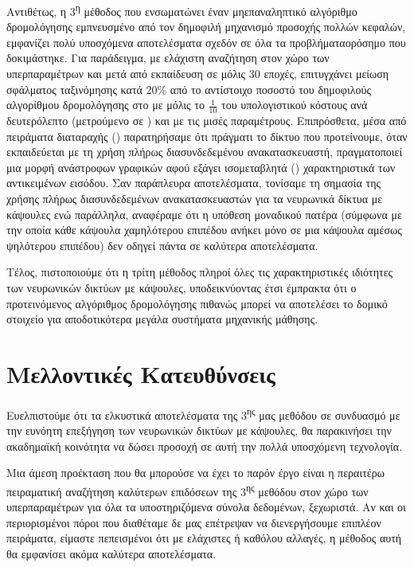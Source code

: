 Αντιθέτως, η 3\textsuperscript{η} μέθοδος που ενσωματώνει έναν μη\textendash επαναληπτικό αλγόριθμο δρομολόγησης εμπνευσμένο από τον δημοφιλή μηχανισμό προσοχής πολλών κεφαλών, εμφανίζει πολύ υποσχόμενα αποτελέσματα σχεδόν σε όλα τα προβλήματα\textendash ορόσημο που δοκιμάστηκε. Για παράδειγμα, με ελάχιστη αναζήτηση στον χώρο των υπερπαραμέτρων και μετά από εκπαίδευση σε μόλις 30 εποχές, επιτυγχάνει μείωση σφάλματος ταξινόμησης κατά 20\% από το αντίστοιχο ποσοστό του δημοφιλούς αλγορίθμου δρομολόγησης  στο   με μόλις το $\frac{1}{10}$ του υπολογιστικού κόστους ανά δευτερόλεπτο (μετρούμενο σε ) και με τις μισές παραμέτρους. Επιπρόσθετα, μέσα από πειράματα διαταραχής () παρατηρήσαμε ότι πράγματι το δίκτυο που προτείνουμε, όταν εκπαιδεύεται με τη χρήση πλήρως διασυνδεδεμένου ανακατασκευαστή, πραγματοποιεί μια μορφή ανάστροφων γραφικών αφού εξάγει ισομεταβλητά () χαρακτηριστικά των αντικειμένων εισόδου. Σαν παράπλευρα αποτελέσματα, τονίσαμε τη σημασία της χρήσης πλήρως διασυνδεδεμένων ανακατασκευαστών για τα νευρωνικά δίκτυα με κάψουλες ενώ παράλληλα, αναφέραμε ότι η υπόθεση μοναδικού πατέρα (σύμφωνα με την οποία κάθε κάψουλα χαμηλότερου επιπέδου ανήκει μόνο σε μια κάψουλα αμέσως ψηλότερου επιπέδου) δεν οδηγεί πάντα σε καλύτερα αποτελέσματα.\par

Τέλος, πιστοποιούμε ότι η τρίτη μέθοδος πληροί όλες τις χαρακτηριστικές ιδιότητες των νευρωνικών δικτύων με κάψουλες, υποδεικνύοντας έτσι έμπρακτα ότι ο προτεινόμενος αλγόριθμος δρομολόγησης πιθανώς μπορεί να αποτελέσει το δομικό στοιχείο για αποδοτικότερα μεγάλα συστήματα μηχανικής μάθησης.

\section{Μελλοντικές Κατευθύνσεις}
Ευελπιστούμε ότι τα ελκυστικά αποτελέσματα της 3\textsuperscript{ης} μας μεθόδου σε συνδυασμό με την ευνόητη επεξήγηση των νευρωνικών δικτύων με κάψουλες, θα παρακινήσει την ακαδημαϊκή κοινότητα να δώσει προσοχή σε αυτή την πολλά υποσχόμενη τεχνολογία.\par

Μια άμεση προέκταση που θα μπορούσε να έχει το παρόν έργο είναι η περαιτέρω πειραματική αναζήτηση καλύτερων επιδόσεων της 3\textsuperscript{ης} μεθόδου στον χώρο των υπερπαραμέτρων για όλα τα υποστηριζόμενα σύνολα δεδομένων, ξεχωριστά. Αν και οι περιορισμένοι πόροι που διαθέταμε δε μας επέτρεψαν να διενεργήσουμε επιπλέον πειράματα, είμαστε πεπεισμένοι ότι με ελάχιστες ή καθόλου αλλαγές, η μέθοδος αυτή θα εμφανίσει ακόμα καλύτερα αποτελέσματα.\par

